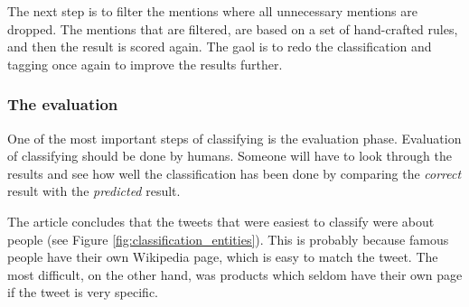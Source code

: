 \documentclass[11pt,english,a4paper]{article}
\begin{document}
The next step is to filter the mentions where all unnecessary mentions are dropped. The mentions that are filtered, are based on a set of hand-crafted rules, and then the result is scored again. The gaol is to redo the classification and tagging once again to improve the results further.

\subsubsection*{The evaluation}
One of the most important steps of classifying is the evaluation phase. Evaluation of classifying should be done by humans. Someone will have to look through the results and see how well the classification has been done by comparing the \textit{correct} result with the \textit{predicted} result.

The article concludes that the tweets that were easiest to classify were about people (see Figure \ref{fig:classification_entities}). This is probably because famous people have their own Wikipedia page, which is easy to match the tweet. The most difficult, on the other hand, was products which seldom have their own page  if the tweet is very specific. 








\end{document}
